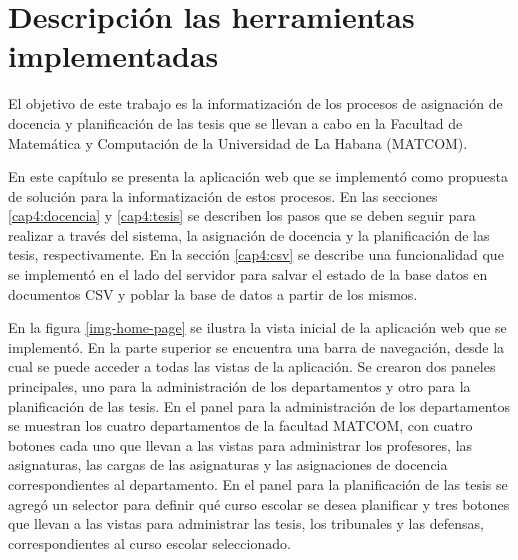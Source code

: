 \chapter{Descripción las herramientas implementadas}\label{chapter:implementation}
El objetivo de este trabajo es la informatización de los 
procesos de asignación de docencia y 
planificación de las tesis que se llevan a cabo 
en la Facultad de Matemática y Computación de la Universidad de La Habana (MATCOM). 

En este capítulo se presenta la aplicación web que se implementó 
como propuesta de solución para la informatización de estos procesos. 
En las secciones \ref{cap4:docencia} y \ref{cap4:tesis} se describen los pasos que se deben 
seguir para realizar a través del sistema, la asignación de docencia y la planificación de las tesis, respectivamente.
En la sección \ref{cap4:csv} se describe una funcionalidad que se implementó en el lado del servidor 
para salvar el estado de la base datos en documentos CSV y poblar la base de datos a partir de los mismos.








En la figura \ref{img-home-page} se ilustra la vista inicial de la 
aplicación web que se implementó. En la parte superior se encuentra una 
barra de navegación, desde la cual se puede acceder a todas las vistas 
de la aplicación. Se crearon dos paneles principales, uno para la administración de 
los departamentos y otro para la planificación de las tesis. En el 
panel para la administración de los departamentos se muestran los cuatro departamentos 
de la facultad MATCOM, con cuatro botones cada uno que llevan a las vistas 
para administrar los profesores, las asignaturas, las cargas de las asignaturas 
y las asignaciones de docencia correspondientes al departamento.
En el panel para la planificación de las tesis se agregó un selector para definir qué curso escolar 
se desea planificar y tres botones que 
llevan a las vistas para administrar las tesis, los tribunales y las defensas, correspondientes 
al curso escolar seleccionado.

